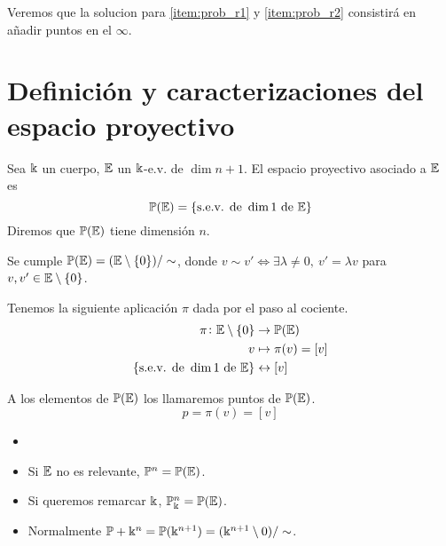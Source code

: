 Veremos que la solucion para \ref{item:prob_r1} y \ref{item:prob_r2} consistirá
en añadir puntos en el $\infty$.

\section{Definición y caracterizaciones del espacio proyectivo}
\begin{defi}
    Sea $\Bbbk$ un cuerpo, $\mathbb{E}$ un $\Bbbk$-e.v. de $\dim n+1$. El espacio proyectivo asociado a $\mathbb{E}$ es
    \[\mathbb{P} (\mathbb{E}) = \left\{\text{s.e.v. de } \dim 1 \text{ de } \mathbb{E}\right\}\]
    Diremos que $\mathbb{P} (\mathbb{E})$ tiene dimensión $n$.
\end{defi}
\begin{obs}
    Se cumple $\mathbb{P} (\mathbb{E}) = (\mathbb{E} \setminus \left\{0\right\}) / \sim$, donde $v \sim v'  \iff \exists \lambda \neq 0, \ v' = \lambda v$ para
    $v, v' \in \mathbb{E} \setminus \left\{0\right\}$.
\end{obs}
\begin{defi}
    Tenemos la siguiente aplicación $\pi$ dada por el paso al cociente.
    \[
    \begin{aligned}
    \pi \colon \mathbb{E} \setminus \left\{0\right\} &\to \mathbb{P} (\mathbb{E})\\
    v &\mapsto \pi(v) = [v]\\
    \left\{\text{s.e.v. de } \dim 1 \text{ de } \mathbb{E}\right\} &\leftrightarrow [v]
    \end{aligned}
    \]
\end{defi}
\begin{defi}
    A los elementos de $\mathbb{P} (\mathbb{E})$ los llamaremos puntos de $\mathbb{P} (\mathbb{E})$.
    \[p = \pi(v) = [v]\]
\end{defi}
\begin{obs}
    \begin{itemize}
        \item[]
        \item Si $\mathbb{E}$ no es relevante, $\mathbb{P}^n = \mathbb{P} (\mathbb{E})$.
        \item Si queremos remarcar $\Bbbk$, $\mathbb{P}_\Bbbk^n = \mathbb{P} (\mathbb{E})$.
        \item Normalmente $\mathbb{P}+\Bbbk^n = \mathbb{P}(\Bbbk^{n+1}) = (\Bbbk^{n+1} \setminus {0})/\sim$.
    \end{itemize}
\end{obs}

